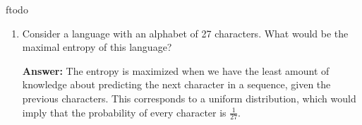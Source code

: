 ƒtodo\documentclass{article}
\newenvironment{QandA}{\begin{enumerate}[label=\arabic*.]}{\end{enumerate}}
\newenvironment{answer}{\par\normalfont \textbf{Answer:}}{}
\newcommand{\g}{\vert}
\begin{document}
\begin{QandA}
\begin{answer}
        \begin{align*}
            w^* &= \argmax_{w} p(Y \g X, w) \\
            &= \argmax_{w} \prod_{i=1}^n p(y_i \g x_i, w) &\text{(iid assumption)} \\
            &= \argmax_{w} \sum_{i=1}^n \log p(y_i \g x_i, w) \\
            &= \argmax_{w} \sum_{i=1}^n \left [\log \left( \frac{1}{\sqrt{2\pi \sigma^2}} \right) -  \frac{(y_i - \hat{y}_i)^2}{2\sigma^2} \right]\\
            &= \argmax_{w} \sum_{i=1}^n -\frac{(y_i - \hat{y}_i)^2}{2\sigma^2} \\
            &= \argmin_{w} \underbrace{\sum_{i=1}^n (y_i - \hat{y}_i)^2}_{\text{Mean Squared Error}}
        \end{align*} 
        Which results in minimizing the Mean Squared Error loss. \\\\
        When doing a multi-class classification problem, the assumption about the likelihood being a Categorical random variable as opposed to a Normal random variable is more natural, hence the common use of the Cross Entropy loss function. \\\\
        In fact, the same line of reasoning can be applied for answering Question 10 of this section. 
    \end{answer}

    \item Consider a language with an alphabet of 27 characters. What would be the maximal entropy of this language?
    \begin{answer}
        The entropy is maximized when we have the least amount of knowledge about predicting the next character in a sequence, given the previous characters. This corresponds to a uniform distribution, which would imply that the probability of every character is $\frac{1}{27}$.
    \end{answer}


\end{QandA}
\end{document}

